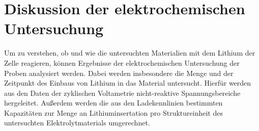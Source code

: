 \documentclass[a4paper, 11pt, headsepline,footsepline,twoside,abstract]{scrbook}
\begin{document}
\section{Diskussion der elektrochemischen Untersuchung}
Um zu verstehen, ob und wie die untersuchten Materialien mit dem Lithium der Zelle reagieren, können Ergebnisse der elektrochemischen Untersuchung der Proben analysiert werden. Dabei werden insbesondere die Menge und der Zeitpunkt des Einbaus von Lithium in das Material untersucht. Hierfür werden aus den Daten der zyklischen Voltametrie nicht-reaktive Spannungsbereiche hergeleitet. Außerdem werden die aus den Ladekennlinien bestimmten Kapazitäten zur Menge an Lithiuminsertation pro Struktureinheit des untersuchten Elektrolytmaterials umgerechnet. %
\end{document}
